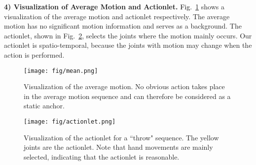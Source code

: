 \documentclass[twocolumn]{article}
\newcommand{\wh}[1]{\textcolor{black}{#1}}
\begin{document}
\vspace{1mm}

\noindent\textbf{4) Visualization of Average Motion and Actionlet.} 
\wh{Fig}.~\ref{fig:mean} shows a visualization of the average motion and actionlet respectively. The average motion has no significant motion information and serves as a background. The actionlet, shown in Fig.~\ref{fig:act}, selects the joints where the motion mainly occurs. Our actionlet is spatio-temporal, because the joints with motion may change when the action is performed.

\begin{figure}[tb]
    \texttt{[image: fig/mean.png]}
    \caption{Visualization of the average motion. No obvious action takes place in the average motion sequence and can therefore be considered as a static anchor.}
    \label{fig:mean}
    \end{figure}
    
    \begin{figure}[tb]
    \texttt{[image: fig/actionlet.png]}
\caption{
    Visualization of the actionlet for a ``throw" sequence. The yellow joints are the actionlet. Note that hand movements are mainly selected, indicating that the actionlet is reasonable.
    }
    \label{fig:act}
    \end{figure}
\end{document}
